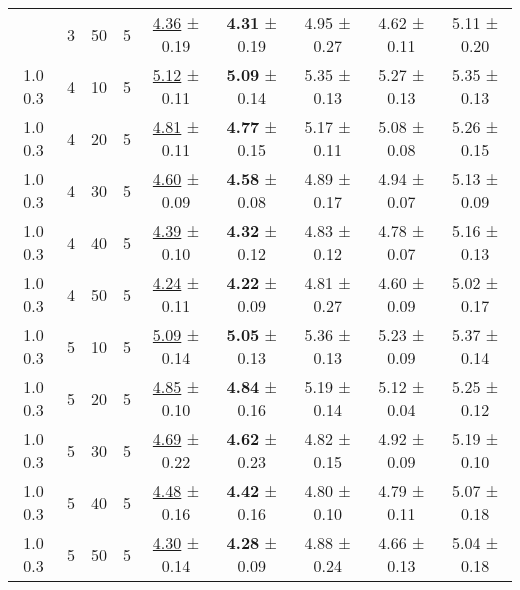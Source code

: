 \begin{tabular}{ccccccccc}
\begin{tabular}{lllllllll}
1.0 0.3 & 3 & 50 & 5 & \underline{4.36} ± 0.19 &    \textbf{4.31} ± 0.19 & 4.95 ± 0.27 & 4.62 ± 0.11 & 5.11 ± 0.20 \\
1.0 0.3 & 4 & 10 & 5 & \underline{5.12} ± 0.11 &    \textbf{5.09} ± 0.14 & 5.35 ± 0.13 & 5.27 ± 0.13 & 5.35 ± 0.13 \\
1.0 0.3 & 4 & 20 & 5 & \underline{4.81} ± 0.11 &    \textbf{4.77} ± 0.15 & 5.17 ± 0.11 & 5.08 ± 0.08 & 5.26 ± 0.15 \\
1.0 0.3 & 4 & 30 & 5 & \underline{4.60} ± 0.09 &    \textbf{4.58} ± 0.08 & 4.89 ± 0.17 & 4.94 ± 0.07 & 5.13 ± 0.09 \\
1.0 0.3 & 4 & 40 & 5 & \underline{4.39} ± 0.10 &    \textbf{4.32} ± 0.12 & 4.83 ± 0.12 & 4.78 ± 0.07 & 5.16 ± 0.13 \\
1.0 0.3 & 4 & 50 & 5 & \underline{4.24} ± 0.11 &    \textbf{4.22} ± 0.09 & 4.81 ± 0.27 & 4.60 ± 0.09 & 5.02 ± 0.17 \\
1.0 0.3 & 5 & 10 & 5 & \underline{5.09} ± 0.14 &    \textbf{5.05} ± 0.13 & 5.36 ± 0.13 & 5.23 ± 0.09 & 5.37 ± 0.14 \\
1.0 0.3 & 5 & 20 & 5 & \underline{4.85} ± 0.10 &    \textbf{4.84} ± 0.16 & 5.19 ± 0.14 & 5.12 ± 0.04 & 5.25 ± 0.12 \\
1.0 0.3 & 5 & 30 & 5 & \underline{4.69} ± 0.22 &    \textbf{4.62} ± 0.23 & 4.82 ± 0.15 & 4.92 ± 0.09 & 5.19 ± 0.10 \\
1.0 0.3 & 5 & 40 & 5 & \underline{4.48} ± 0.16 &    \textbf{4.42} ± 0.16 & 4.80 ± 0.10 & 4.79 ± 0.11 & 5.07 ± 0.18 \\
1.0 0.3 & 5 & 50 & 5 & \underline{4.30} ± 0.14 &    \textbf{4.28} ± 0.09 & 4.88 ± 0.24 & 4.66 ± 0.13 & 5.04 ± 0.18 \\
\bottomrule
\end{tabular}
